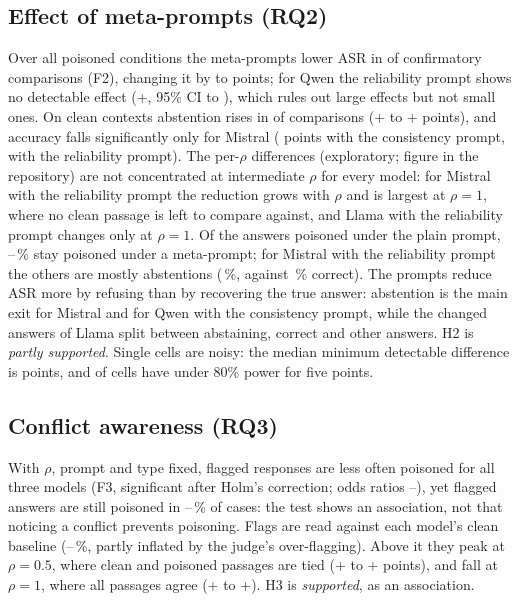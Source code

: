 \documentclass[pdflatex,sn-mathphys-ay]{sn-jnl}
\begin{document}
\subsection{Effect of meta-prompts (RQ2)}\label{sec:rq2}
Over all poisoned conditions the meta-prompts lower ASR in \FTwoAsrSig{} of
\FTwoAsrTests{} confirmatory comparisons (F2), changing it by \FTwoAsrLlamaRel{} to
\FTwoAsrMistralRel{} points; for Qwen the reliability prompt shows no
detectable effect (+\FTwoAsrQwenRel, 95\% CI \FTwoAsrQwenRelLo{} to
\FTwoAsrQwenRelHi), which rules out large effects but not small ones. On clean
contexts abstention rises in \FTwoAbstUp{} of \FTwoAbstTests{} comparisons
(+\FTwoAbstMistralCons{} to +\FTwoAbstMistralRel{} points), and accuracy falls
significantly only for Mistral (\FTwoAccMistralCons{} points with the
consistency prompt, \FTwoAccMistralRel{} with the reliability prompt). The
per-$\rho$ differences (exploratory; figure in the repository) are not
concentrated at intermediate $\rho$ for every model: for Mistral with the
reliability prompt the reduction grows with $\rho$ and is largest at $\rho=1$,
where no clean passage is left to compare against, and Llama with the
reliability prompt changes only at $\rho=1$. Of the answers poisoned under the
plain prompt, \TransStayMin--\TransStayMax\,\% stay poisoned under a
meta-prompt; for Mistral with the reliability prompt the others are mostly
abstentions (\TransMistralRelAbstain\,\%, against \TransMistralRelCorrect\,\%
correct). The prompts reduce ASR more by refusing than by recovering the true answer: abstention is the main exit for Mistral and for Qwen with the consistency prompt, while the changed answers of Llama split between abstaining, correct and other answers. H2 is \emph{partly supported}. Single cells are noisy: the median
minimum detectable difference is \MddMedian{} points, and \MddUnderpowered{}
of \MddCells{} cells have under 80\% power for five points.

\subsection{Conflict awareness (RQ3)}\label{sec:rq3}
With $\rho$, prompt and type fixed, flagged responses are less often poisoned
for all three models (F3, significant after Holm's correction; odds ratios
\FThreeOrMistral--\FThreeOrLlama), yet flagged answers are still poisoned in
\FThreeAsrFlaggedMistral--\FThreeAsrFlaggedQwen\,\% of cases: the test shows
an association, not that noticing a conflict prevents poisoning. Flags are
read against each model's clean baseline
(\FlagBaseMistral--\FlagBaseLlama\,\%, partly inflated by the judge's
over-flagging). Above it they peak at $\rho=0.5$, where clean and poisoned
passages are tied (+\FlagDiffMistralRhoHalf{} to +\FlagDiffLlamaRhoHalf{}
points), and fall at $\rho=1$, where all passages agree
(+\FlagDiffMistralRhoOne{} to +\FlagDiffLlamaRhoOne). H3 is \emph{supported},
as an association.
\end{document}
